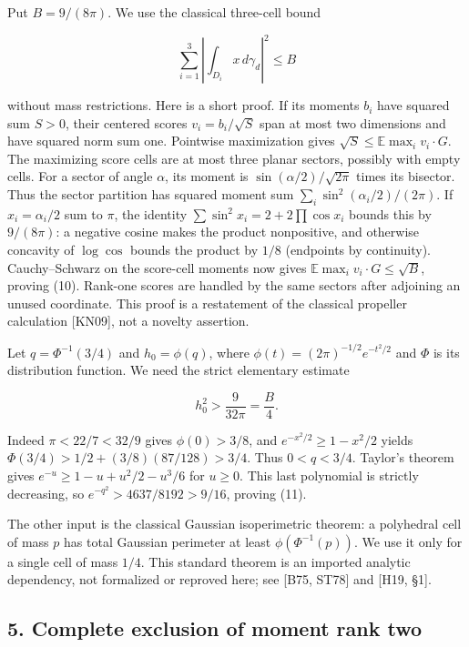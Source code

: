 \documentclass[
  11pt,
]{article}
\begin{document}
Put \(B=9/(8\pi)\). We use the classical three-cell bound

\[
 \sum_{i=1}^3\left|\int_{D_i}x\,d\gamma_d\right|^2\le B  \tag{10}
\]

without mass restrictions. Here is a short proof. If its moments \(b_i\)
have squared sum \(S>0\), their centered scores \(v_i=b_i/\sqrt S\) span
at most two dimensions and have squared norm sum one. Pointwise
maximization gives \(\sqrt S\le\mathbb E\max_i v_i\cdot G\). The
maximizing score cells are at most three planar sectors, possibly with
empty cells. For a sector of angle \(\alpha\), its moment is
\(\sin(\alpha/2)/\sqrt{2\pi}\) times its bisector. Thus the sector
partition has squared moment sum \(\sum_i\sin^2(\alpha_i/2)/(2\pi)\). If
\(x_i=\alpha_i/2\) sum to \(\pi\), the identity
\(\sum\sin^2x_i=2+2\prod\cos x_i\) bounds this by \(9/(8\pi)\): a
negative cosine makes the product nonpositive, and otherwise concavity
of \(\log\cos\) bounds the product by \(1/8\) (endpoints by continuity).
Cauchy--Schwarz on the score-cell moments now gives
\(\mathbb E\max_i v_i\cdot G\le\sqrt B\), proving (10). Rank-one scores
are handled by the same sectors after adjoining an unused coordinate.
This proof is a restatement of the classical propeller calculation
{[}KN09{]}, not a novelty assertion.

Let \(q=\Phi^{-1}(3/4)\) and \(h_0=\phi(q)\), where
\(\phi(t)=(2\pi)^{-1/2}e^{-t^2/2}\) and \(\Phi\) is its distribution
function. We need the strict elementary estimate

\[
 h_0^2>\frac{9}{32\pi}=\frac B4.                          \tag{11}
\]

Indeed \(\pi<22/7<32/9\) gives \(\phi(0)>3/8\), and
\(e^{-x^2/2}\ge1-x^2/2\) yields \(\Phi(3/4)>1/2+(3/8)(87/128)>3/4\).
Thus \(0<q<3/4\). Taylor's theorem gives \(e^{-u}\ge1-u+u^2/2-u^3/6\)
for \(u\ge0\). This last polynomial is strictly decreasing, so
\(e^{-q^2}>4637/8192>9/16\), proving (11).

The other input is the classical Gaussian isoperimetric theorem: a
polyhedral cell of mass \(p\) has total Gaussian perimeter at least
\(\phi(\Phi^{-1}(p))\). We use it only for a single cell of mass
\(1/4\). This standard theorem is an imported analytic dependency, not
formalized or reproved here; see {[}B75, ST78{]} and {[}H19, §1{]}.

\subsection{5. Complete exclusion of moment rank
two}\label{complete-exclusion-of-moment-rank-two}
\end{document}
